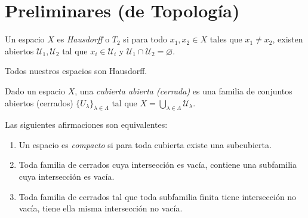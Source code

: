 \newpage
{}
\setcounter{page}{1}
\markboth{}{} 


\section*{Preliminares (de Topología)}

\begin{tcolorbox}[colback=blue-violet!5!white,colframe=blue-violet!75!black,title=\textbf{Definición}.]
    Un espacio \(X\) es \textit{Hausdorff} o \(T_2\) si 
    para todo \(x_1, x_2\in X\) tales que \(x_1\neq x_2\), existen abiertos \(\mathcal{U}_1, \mathcal{U}_2\) 
    tal que \(x_i\in\mathcal{U}_i\) y \(\mathcal{U}_1\cap\mathcal{U}_2 =\varnothing\).
\end{tcolorbox}

\begin{tcolorbox}[colback=antiquefuchsia!15!white,colframe=antiquefuchsia!75!black,title=\textbf{Convención}]
    Todos nuestros espacios son Hausdorff.
\end{tcolorbox}

\begin{tcolorbox}[colback=blue-violet!5!white,colframe=blue-violet!75!black,title=\textbf{Definición}.]
    Dado un espacio \(X\), una \textit{cubierta abierta (cerrada)} es una familia de conjuntos abiertos (cerrados) 
    \(\{U_\lambda\}_{\lambda\in\Lambda}\) tal que \(X=\displaystyle\bigcup_{\lambda\in\Lambda}\mathcal{U}_\lambda\).
\end{tcolorbox}

\begin{tcolorbox}[colback=antiquefuchsia!15!white,colframe=antiquefuchsia!75!black,title=\textbf{Observación}]
    Las siguientes afirmaciones son equivalentes:
    \begin{enumerate}[noitemsep, topsep=0pt]
        \item Un espacio es \textit{compacto} si para toda cubierta existe una subcubierta.
        \item Toda familia de cerrados cuya intersección es vacía, contiene una subfamilia cuya intersección es vacía.
        \item Toda familia de cerrados tal que toda subfamilia finita tiene intersección no vacía, tiene ella misma intersección no vacía. 
    \end{enumerate}
\end{tcolorbox}

